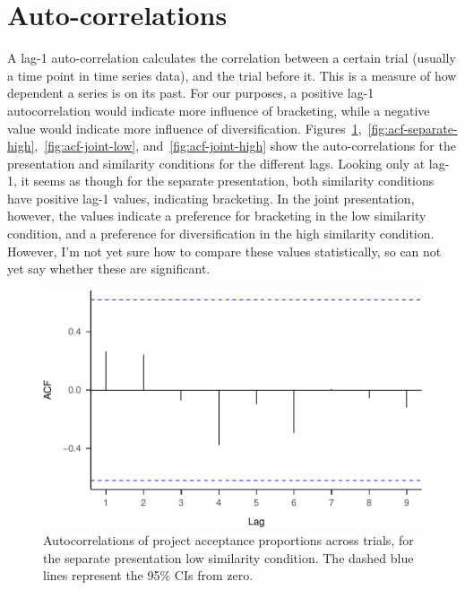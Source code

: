 \documentclass[
  english,
  man, donotrepeattitle,floatsintext]{apa7}
\begin{document}
\hypertarget{auto-correlations}{%
\section{Auto-correlations}\label{auto-correlations}}

A lag-1 auto-correlation calculates the correlation between a certain trial (usually a time point in time series data), and the trial before it. This is a measure of how dependent a series is on its past. For our purposes, a positive lag-1 autocorrelation would indicate more influence of bracketing, while a negative value would indicate more influence of diversification. Figures~\ref{fig:acf-separate-low},~\ref{fig:acf-separate-high},~\ref{fig:acf-joint-low}, and~\ref{fig:acf-joint-high} show the auto-correlations for the presentation and similarity conditions for the different lags. Looking only at lag-1, it seems as though for the separate presentation, both similarity conditions have positive lag-1 values, indicating bracketing. In the joint presentation, however, the values indicate a preference for bracketing in the low similarity condition, and a preference for diversification in the high similarity condition. However, I'm not yet sure how to compare these values statistically, so can not yet say whether these are significant.

\begin{figure}
\centering
\includegraphics{aggregation_trials_files/figure-latex/acf-separate-low-1.pdf}
\caption{\label{fig:acf-separate-low}Autocorrelations of project acceptance proportions across trials, for the separate presentation low similarity condition. The dashed blue lines represent the 95\% CIs from zero.}
\end{figure}
\end{document}
